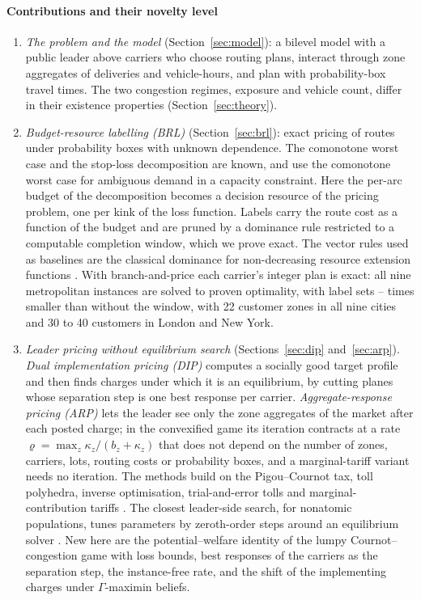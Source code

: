\documentclass[preprint,12pt]{elsarticle}
\theoremstyle{definition}
\theoremstyle{remark}
\begin{document}
\paragraph{Contributions and their novelty level}
\begin{enumerate}[label=(\roman*),leftmargin=*]
\item \emph{The problem and the model} (Section~\ref{sec:model}): a bilevel model with a public leader above carriers who choose routing plans, interact through zone aggregates of deliveries and vehicle-hours, and plan with probability-box travel times. The two congestion regimes, exposure and vehicle count, differ in their existence properties (Section~\ref{sec:theory}).
\item \emph{Budget-resource labelling (BRL)} (Section~\ref{sec:brl}): exact pricing of routes under probability boxes with unknown dependence. The comonotone worst case and the stop-loss decomposition \citep{Meilijson1979,Tchen1980} are known, and \citet{GhosalHoWiesemann2024} use the comonotone worst case for ambiguous demand in a capacity constraint. Here the per-arc budget of the decomposition becomes a decision resource of the pricing problem, one per kink of the loss function. Labels carry the route cost as a function of the budget and are pruned by a dominance rule restricted to a computable completion window, which we prove exact. The vector rules used as baselines are the classical dominance for non-decreasing resource extension functions \citep{Irnich2008}. With branch-and-price each carrier's integer plan is exact: all nine metropolitan instances are solved to proven optimality, with label sets \BrlLabNowinMetroMin--\BrlLabNowinMetroMax{} times smaller than without the window, with 22 customer zones in all nine cities and 30 to 40 customers in London and New York.
\item \emph{Leader pricing without equilibrium search} (Sections~\ref{sec:dip} and~\ref{sec:arp}). \emph{Dual implementation pricing (DIP)} computes a socially good target profile and then finds charges under which it is an equilibrium, by cutting planes whose separation step is one best response per carrier. \emph{Aggregate-response pricing (ARP)} lets the leader see only the zone aggregates of the market after each posted charge; in the convexified game its iteration contracts at a rate $\varrho=\max_z\kappa_z/(b_z+\kappa_z)$ that does not depend on the number of zones, carriers, lots, routing costs or probability boxes, and a marginal-tariff variant needs no iteration. The methods build on the Pigou--Cournot tax, toll polyhedra, inverse optimisation, trial-and-error tolls and marginal-contribution tariffs \citep{Buchanan1969,Bergendorff1997,Ahuja2001,Yang2004,Wolpert2001,Sandholm2002,Maheshwari2022}. The closest leader-side search, for nonatomic populations, tunes parameters by zeroth-order steps around an equilibrium solver \citep{Masiha2026}. New here are the potential--welfare identity of the lumpy Cournot--congestion game with loss bounds, best responses of the carriers as the separation step, the instance-free rate, and the shift of the implementing charges under $\Gamma$-maximin beliefs.

\end{enumerate}
\end{document}
